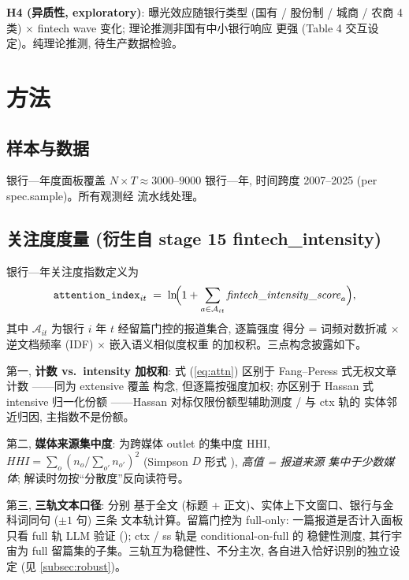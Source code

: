 \textbf{H4 (异质性, exploratory)}: 曝光效应随银行类型 (国有 / 股份制 /
城商 / 农商 4 类) $\times$ fintech wave 变化; 理论推测非国有中小银行响应
更强 (Table 4 交互设定)。纯理论推测, 待生产数据检验。

\section{方法}\label{sec:method}
\subsection{样本与数据}
银行—年度面板覆盖 $N \times T \approx 3000\text{--}9000$ 银行—年, 时间跨度
2007--2025 (per spec.sample)。所有观测经  流水线处理。

\subsection{关注度度量 (衍生自 stage 15 fintech\_intensity)}\label{subsec:attention}
银行—年关注度指数定义为
\begin{equation}\label{eq:attn}
\texttt{attention\_index}_{it} \;=\; \ln\!\Bigl(1 + \sum_{a \in \mathcal{A}_{it}}
\mathit{fintech\_intensity\_score}_a\Bigr),
\end{equation}
其中 $\mathcal{A}_{it}$ 为银行 $i$ 年 $t$ 经留篇门控的报道集合, 逐篇强度
得分 = 词频对数折减 $\times$ 逆文档频率 (IDF) $\times$ 嵌入语义相似度权重
的加权积。三点构念披露如下。

第一, \textbf{计数 vs.\ intensity 加权和}: 式 (\ref{eq:attn}) 区别于
Fang--Peress 式无权文章计数 \parencite{fang2009media}——同为 extensive 覆盖
构念, 但逐篇按强度加权; 亦区别于 Hassan 式 intensive 归一化份额
\parencite{hassan2019firm}——Hassan 对标仅限份额型辅助测度
 /  与 ctx 轨的
实体邻近归因, 主指数不是份额。

第二, \textbf{媒体来源集中度}:  为跨媒体
outlet 的集中度 HHI, $\mathit{HHI} = \sum_o (n_o / \sum_{o'} n_{o'})^2$
(Simpson $D$ 形式 \parencite{simpson1949diversity}), \emph{高值 = 报道来源
集中于少数媒体}; 解读时勿按``分散度''反向读符号。

第三, \textbf{三轨文本口径}:  分别
基于全文 (标题 + 正文)、实体上下文窗口、银行与金科词同句 ($\pm 1$ 句) 三条
文本轨计算。留篇门控为 full-only: 一篇报道是否计入面板只看 full 轨 LLM
验证 (); ctx / ss 轨是 conditional-on-full 的
稳健性测度, 其行宇宙为 full 留篇集的子集。三轨互为稳健性、不分主次,
各自进入恰好识别的独立设定 (见 \ref{subsec:robust})。


